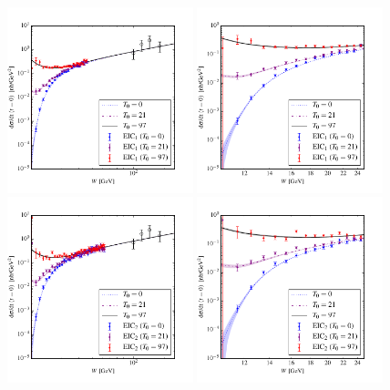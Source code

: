 \documentclass[10pt,prd,aps,nofootinbib,superscriptaddress]{revtex4}
\begin{document}
\begin{figure}
\includegraphics[width=0.48\textwidth]{dsdt_y_eic1.pdf}
\includegraphics[width=0.48\textwidth]{dsdt_y_close_eic1.pdf}
\includegraphics[width=0.48\textwidth]{dsdt_y_eic2.pdf}
\includegraphics[width=0.48\textwidth]{dsdt_y_close_eic2.pdf}

\end{figure}
\end{document}
